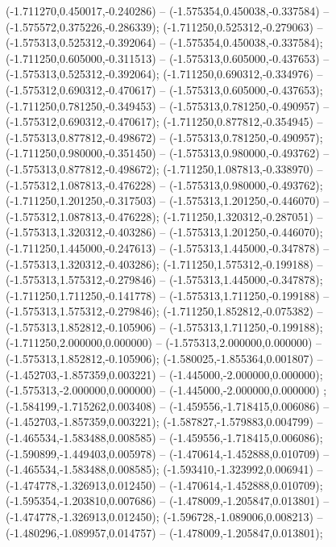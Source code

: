  (-1.711270,0.450017,-0.240286) -- (-1.575354,0.450038,-0.337584) -- (-1.575572,0.375226,-0.286339);
 (-1.711250,0.525312,-0.279063) -- (-1.575313,0.525312,-0.392064) -- (-1.575354,0.450038,-0.337584);
 (-1.711250,0.605000,-0.311513) -- (-1.575313,0.605000,-0.437653) -- (-1.575313,0.525312,-0.392064);
 (-1.711250,0.690312,-0.334976) -- (-1.575312,0.690312,-0.470617) -- (-1.575313,0.605000,-0.437653);
 (-1.711250,0.781250,-0.349453) -- (-1.575313,0.781250,-0.490957) -- (-1.575312,0.690312,-0.470617);
 (-1.711250,0.877812,-0.354945) -- (-1.575313,0.877812,-0.498672) -- (-1.575313,0.781250,-0.490957);
 (-1.711250,0.980000,-0.351450) -- (-1.575313,0.980000,-0.493762) -- (-1.575313,0.877812,-0.498672);
 (-1.711250,1.087813,-0.338970) -- (-1.575312,1.087813,-0.476228) -- (-1.575313,0.980000,-0.493762);
 (-1.711250,1.201250,-0.317503) -- (-1.575313,1.201250,-0.446070) -- (-1.575312,1.087813,-0.476228);
 (-1.711250,1.320312,-0.287051) -- (-1.575313,1.320312,-0.403286) -- (-1.575313,1.201250,-0.446070);
 (-1.711250,1.445000,-0.247613) -- (-1.575313,1.445000,-0.347878) -- (-1.575313,1.320312,-0.403286);
 (-1.711250,1.575312,-0.199188) -- (-1.575313,1.575312,-0.279846) -- (-1.575313,1.445000,-0.347878);
 (-1.711250,1.711250,-0.141778) -- (-1.575313,1.711250,-0.199188) -- (-1.575313,1.575312,-0.279846);
 (-1.711250,1.852812,-0.075382) -- (-1.575313,1.852812,-0.105906) -- (-1.575313,1.711250,-0.199188);
 (-1.711250,2.000000,0.000000) -- (-1.575313,2.000000,0.000000) -- (-1.575313,1.852812,-0.105906);
 (-1.580025,-1.855364,0.001807) -- (-1.452703,-1.857359,0.003221) -- (-1.445000,-2.000000,0.000000);
 (-1.575313,-2.000000,0.000000) -- (-1.445000,-2.000000,0.000000) ;
 (-1.584199,-1.715262,0.003408) -- (-1.459556,-1.718415,0.006086) -- (-1.452703,-1.857359,0.003221);
 (-1.587827,-1.579883,0.004799) -- (-1.465534,-1.583488,0.008585) -- (-1.459556,-1.718415,0.006086);
 (-1.590899,-1.449403,0.005978) -- (-1.470614,-1.452888,0.010709) -- (-1.465534,-1.583488,0.008585);
 (-1.593410,-1.323992,0.006941) -- (-1.474778,-1.326913,0.012450) -- (-1.470614,-1.452888,0.010709);
 (-1.595354,-1.203810,0.007686) -- (-1.478009,-1.205847,0.013801) -- (-1.474778,-1.326913,0.012450);
 (-1.596728,-1.089006,0.008213) -- (-1.480296,-1.089957,0.014757) -- (-1.478009,-1.205847,0.013801);
